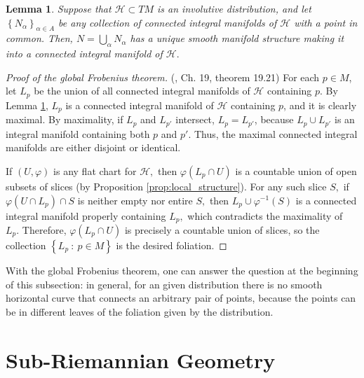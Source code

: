 \documentclass[12pt, letterpaper, reqno]{amsart}
\theoremstyle{definition}
\theoremstyle{plain}
\newtheorem{lm}{Lemma}
\theoremstyle{remark}
\begin{document}
\begin{lm}\label{lm:man_struct}
	Suppose that $ \mathcal{H}\subset TM $ is an involutive distribution, and let $ \left\{ N_\alpha \right\}_{\alpha\in A} $ be any collection of connected integral manifolds of $ \mathcal{H} $ with a point in common. Then, $ N=\bigcup_{\alpha} N_\alpha $ has a unique smooth manifold structure making it into a connected integral manifold of $ \mathcal{H}. $  
\end{lm}

\begin{proof}[Proof of the global Frobenius theorem]
	(\cite{lee2003introduction}, Ch. 19, theorem 19.21) For each $ p\in M $, let $ L_p $ be the union of all connected integral manifolds of $ \mathcal{H} $ containing $ p. $ By Lemma \ref{lm:man_struct}, $ L_p $ is a connected integral manifold of $ \mathcal{H} $ containing $ p $, and it is clearly maximal. By maximality, if $ L_p $ and $ L_{p'} $ intersect, $ L_p=L_{p'} $, because $ L_p\cup L_{p'} $ is an integral manifold containing both $ p $ and $ p' $. Thus, the maximal connected integral manifolds are either disjoint or identical.    

	If $ (U,\varphi) $ is any flat chart for $ \mathcal{H}, $ then $ \varphi(L_p\cap U) $ is a countable union of open subsets of slices (by Proposition \ref{prop:local_structure}). For any such slice $ S, $ if $ \varphi(U\cap L_p)\cap S $ is neither empty nor entire $ S, $ then $ L_p\cup \varphi^{-1}(S )$ is a connected integral manifold properly containing $ L_p, $ which contradicts the maximality of $ L_p. $ Therefore, $ \varphi(L_p\cap U) $ is precisely a countable union of slices, so the collection $ \left\{ L_p\ : \ p\in M \right\} $ is the desired foliation.
\end{proof}

With the global Frobenius theorem, one can answer the question at the beginning of this subsection: in general, for an given distribution there is no smooth horizontal curve that connects an arbitrary pair of points, because the points can be in different leaves of the foliation given by the distribution.


\section{Sub-Riemannian Geometry}%
\label{sec:sub-Riemannian_geometry}
\end{document}
